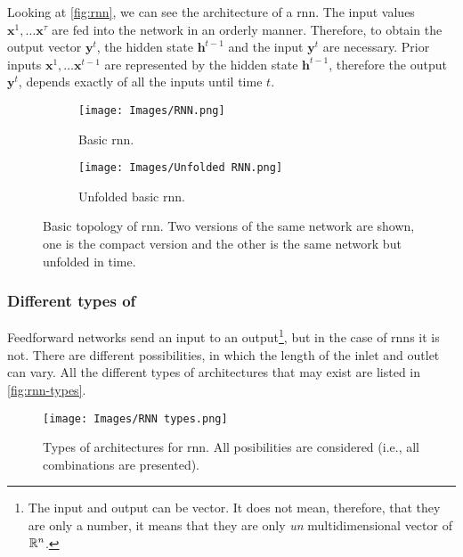 Looking at \vref{fig:rnn}, we can see the architecture of a \gls{rnn}. The
input values \(\mathbf{x}^1, \ldots \mathbf{x}^\tau\) are fed into the network
in an orderly manner. Therefore, to obtain the output vector \(\mathbf{y}^t\),
the hidden state \(\mathbf{h}^{t - 1}\) and the input \(\mathbf{y}^{t}\) are
necessary. Prior inputs \(\mathbf{x}^1, \ldots \mathbf{x}^{t - 1}\) are
represented by the hidden state \(\mathbf{h}^{t - 1}\), therefore the output
\(\mathbf{y}^t\), depends exactly of all the inputs until time \(t\).

\begin{figure}[ht]
  \begin{subfigure}[t]{.2\textwidth}
    \centering
    \caption{Basic \gls{rnn}.}
    \texttt{[image: Images/RNN.png]}
  \end{subfigure}\hfill
  \begin{subfigure}[t]{.8\textwidth}
    \centering
    \caption{Unfolded basic \gls{rnn}.}
    \texttt{[image: Images/Unfolded RNN.png]}
  \end{subfigure}
  \caption[Basic topology of ]{Basic topology of
    \acf{rnn}. Two versions of the same network are shown, one is the compact
    version and the other is the same network but unfolded in time.}
  \label{fig:rnn}
\end{figure}

\subsubsection{Different types of }

Feedforward networks send an input to an output\footnote{The input and output
  can be vector. It does not mean, therefore, that they are only a number, it
  means that they are only \emph{un} multidimensional vector of \(\mathbb{R}^n\).}, but
in the case of \glspl{rnn} it is not. There are different possibilities, in
which the length of the inlet and outlet can vary. All the different types of
architectures that may exist are listed in \vref{fig:rnn-types}.

\begin{figure}[ht]
  \centering
  \texttt{[image: Images/RNN types.png]}
  \caption[Types of architectures for ]{Types of
    architectures for \gls{rnn}. All posibilities are considered (i.e., all
    combinations are presented).}
  \label{fig:rnn-types}
\end{figure}


